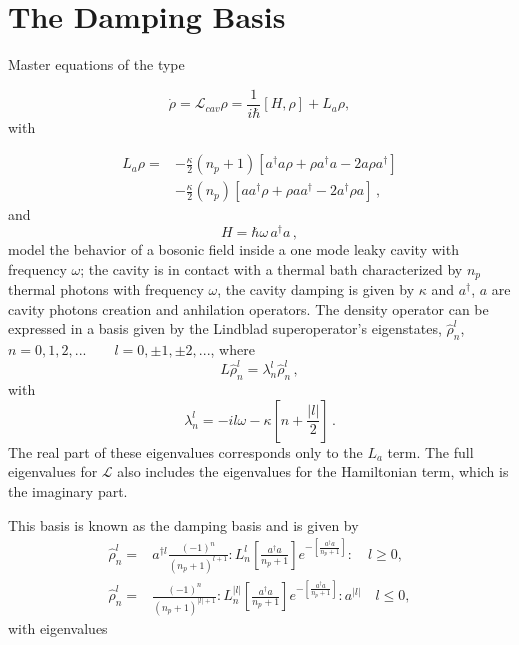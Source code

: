 \documentclass[reprint, amsmath,amssymb, aps,pra]{revtex4-1}
\begin{document}
\appendix
\section{The Damping Basis}\label{App1}

Master equations of the type 

\begin{equation}
\dot{\rho} = \mathcal{L}_{cav} \rho = \frac{1}{i\hbar}[H,\rho]+L_a\rho, 
\end{equation} with

\begin{align}\label{EMField}
L_a \rho =& - \frac{\kappa}{2}(n_p+1)[a^\dagger a\rho + \rho a^\dagger a -2a\rho a^\dagger] \nonumber \\
 &- \frac{\kappa}{2}(n_p)[ aa^\dagger\rho + \rho  aa^\dagger -2a^\dagger\rho a]\, ,
\end{align}
and
\begin{equation}
  H=\hbar \omega \, a^\dagger a\, ,
\end{equation}
model the behavior of a bosonic field inside a one mode leaky cavity
with frequency $\omega$; the cavity is in contact with a thermal bath
characterized by $n_p$ thermal photons with frequency $\omega$, the
cavity damping is given by $\kappa$ \cite{EnglertDB} and $a^\dagger$,
$a$ are cavity photons creation and anhilation operators. The density
operator can be expressed in a basis given by the Lindblad
superoperator's eigenstates, ${\hat{\rho}_n^l}$,
$n=0,1,2,...\qquad l = 0,\pm 1, \pm 2,... $, where
\begin{equation}
L\hat{\rho}_n^l = \lambda_n^l\hat{\rho}_n^l\label{eq:eigen_damping}\, ,
\end{equation}
with
\begin{equation}
\lambda_n^l = -il\omega -\kappa[n + \frac{|l|}{2}]\, .
\end{equation} The real part of these eigenvalues corresponds only to the $L_a$ term. The full eigenvalues for $\mathcal{L}$  also includes the eigenvalues for the Hamiltonian term, which is the imaginary part.


This basis is known as the damping basis \cite{EnglertDB} and is given by
\begin{align}\label{DefDB}
\hat{\rho}_n^l=&a^{\dagger l}\frac{(-1)^n}{(n_p+1)^{l+1}}:L_n^l[\frac{a^\dagger a}{n_p+1}]e^{-[\frac{a^\dagger a}{n_p+1}]}:\quad l \geq 0, \\
\hat{\rho}_n^l=&\frac{(-1)^n}{(n_p+1)^{|l|+1}}:L_n^{|l|}[\frac{a^\dagger a}{n_p+1}]e^{-[\frac{a^\dagger a}{n_p+1}]}:a^{|l|}\quad l \leq 0,
\end{align} with eigenvalues
\end{document}
